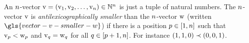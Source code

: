 
An $n$-vector $\mathrm{v} = (\mathrm{v}_{1}, \mathrm{v}_{2}, \dots, \mathrm{v}_{n}) \in
\mathbb{N}^{n}$ is just a tuple of natural numbers.
The $n$-vector $\mathrm{v}$ is \emph{antilexicographically smaller}
than the $n$-vector $\mathrm{w}$ (written $\gls{vector-v-smaller-w}$) if there is
a position $p \in [1, n]$ such that $\mathrm{v}_{p} < \mathrm{w}_{p}$ and
$\mathrm{v}_{q} = \mathrm{w}_{q}$ for all $q \in [p+1, n]$.
For instance $(1,1,0)\prec(0,0,1)$.
